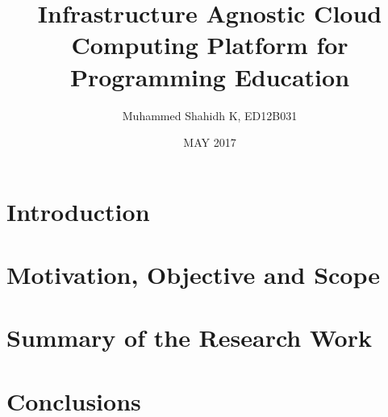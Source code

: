 \documentclass[DD,synopsis]{iitmdiss}
\title{Infrastructure Agnostic Cloud Computing Platform for Programming Education}
\author{Muhammed Shahidh K, ED12B031}
\date{MAY 2017}
\begin{document}
\maketitle



\setcounter{page}{0}
\section{Introduction}

\section{Motivation, Objective and Scope}

\section{Summary of the Research Work}

\section{Conclusions}


\end{document}
